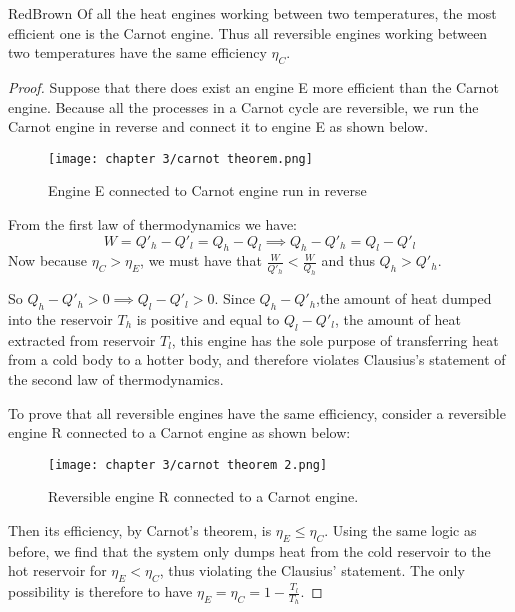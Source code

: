 \documentclass[a4paper,11pt,oneside]{book}
\begin{document}
\begin{mybox}{RedBrown}{\textbf{}}
Of all the heat engines working between two temperatures, the most efficient one is the Carnot engine. Thus all reversible engines working between two temperatures have the same efficiency $\eta_C$.
\end{mybox}
\begin{proof}
Suppose that there does exist an engine E more efficient than the Carnot engine. Because all the processes in a Carnot cycle are reversible, we run the Carnot engine in reverse and connect it to engine E as shown below. 
\begin{figure}[h!]
    \centering
    \texttt{[image: chapter 3/carnot theorem.png]}
    \caption{Engine E connected to Carnot engine run in reverse}
    \label{fig:my_label}
\end{figure}


From the first law of thermodynamics we have:
\begin{equation}
    W = Q'_h-Q'_l = Q_h - Q_l \implies Q_h-Q'_h = Q_l-Q'_l
\end{equation}
Now because $\eta_C>\eta_E$, we must have that $\frac{W}{Q'_h}<\frac{W}{Q_h}$ and thus $Q_h > Q'_h$.

So $Q_h-Q'_h>0 \implies Q_l-Q'_l>0$. Since $Q_h-Q'_h$,the amount of heat dumped into the reservoir $T_h$ is positive and equal to $Q_l-Q'_l$,  the amount of heat extracted from reservoir $T_l$, this engine has the sole purpose of transferring heat from a cold body to a hotter body, and therefore violates Clausius's statement of the second law of thermodynamics. 

To prove that all reversible engines have the same efficiency, consider a reversible engine R connected to a Carnot engine as shown below:
\begin{figure}[h!]
    \centering
    \texttt{[image: chapter 3/carnot theorem 2.png]}
    \caption{Reversible engine R connected to a Carnot engine.}
    \label{fig:my_label}
\end{figure}


Then its efficiency, by Carnot's theorem, is $\eta_E \leq \eta_C$. Using the same logic as before, we find that the system only dumps heat from the cold reservoir to the hot reservoir for $\eta_E < \eta_C$, thus violating the Clausius' statement. The only possibility is therefore to have $\eta_E = \eta_C=1-\frac{T_l}{T_h}$. 
\end{proof}
\end{document}
